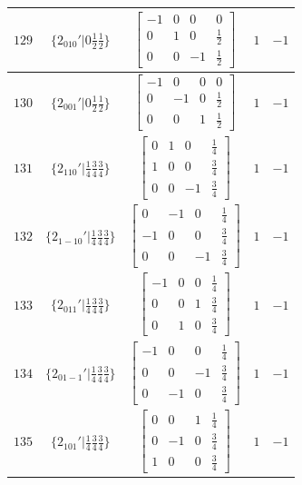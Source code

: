 \documentclass[fleqn,8pt]{jsarticle}
\begin{document}
\begin{longtable}{ccccc}
$ 129 $ & $ \{2{}_{010}{}'|0 \frac{1}{2} \frac{1}{2}\} $ & $ \begin{bmatrix} -1 & 0 & 0 & 0 \\ 0 & 1 & 0 & \frac{1}{2} \\ 0 & 0 & -1 & \frac{1}{2} \end{bmatrix} $ & $ 1 $ & $ -1 $ \\ \hline
$ 130 $ & $ \{2{}_{001}{}'|0 \frac{1}{2} \frac{1}{2}\} $ & $ \begin{bmatrix} -1 & 0 & 0 & 0 \\ 0 & -1 & 0 & \frac{1}{2} \\ 0 & 0 & 1 & \frac{1}{2} \end{bmatrix} $ & $ 1 $ & $ -1 $ \\ \hline
$ 131 $ & $ \{2{}_{110}{}'|\frac{1}{4} \frac{3}{4} \frac{3}{4}\} $ & $ \begin{bmatrix} 0 & 1 & 0 & \frac{1}{4} \\ 1 & 0 & 0 & \frac{3}{4} \\ 0 & 0 & -1 & \frac{3}{4} \end{bmatrix} $ & $ 1 $ & $ -1 $ \\ \hline
$ 132 $ & $ \{2{}_{1-10}{}'|\frac{1}{4} \frac{3}{4} \frac{3}{4}\} $ & $ \begin{bmatrix} 0 & -1 & 0 & \frac{1}{4} \\ -1 & 0 & 0 & \frac{3}{4} \\ 0 & 0 & -1 & \frac{3}{4} \end{bmatrix} $ & $ 1 $ & $ -1 $ \\ \hline
$ 133 $ & $ \{2{}_{011}{}'|\frac{1}{4} \frac{3}{4} \frac{3}{4}\} $ & $ \begin{bmatrix} -1 & 0 & 0 & \frac{1}{4} \\ 0 & 0 & 1 & \frac{3}{4} \\ 0 & 1 & 0 & \frac{3}{4} \end{bmatrix} $ & $ 1 $ & $ -1 $ \\ \hline
$ 134 $ & $ \{2{}_{01-1}{}'|\frac{1}{4} \frac{3}{4} \frac{3}{4}\} $ & $ \begin{bmatrix} -1 & 0 & 0 & \frac{1}{4} \\ 0 & 0 & -1 & \frac{3}{4} \\ 0 & -1 & 0 & \frac{3}{4} \end{bmatrix} $ & $ 1 $ & $ -1 $ \\ \hline
$ 135 $ & $ \{2{}_{101}{}'|\frac{1}{4} \frac{3}{4} \frac{3}{4}\} $ & $ \begin{bmatrix} 0 & 0 & 1 & \frac{1}{4} \\ 0 & -1 & 0 & \frac{3}{4} \\ 1 & 0 & 0 & \frac{3}{4} \end{bmatrix} $ & $ 1 $ & $ -1 $ \\ \hline

\end{longtable}
\end{document}
